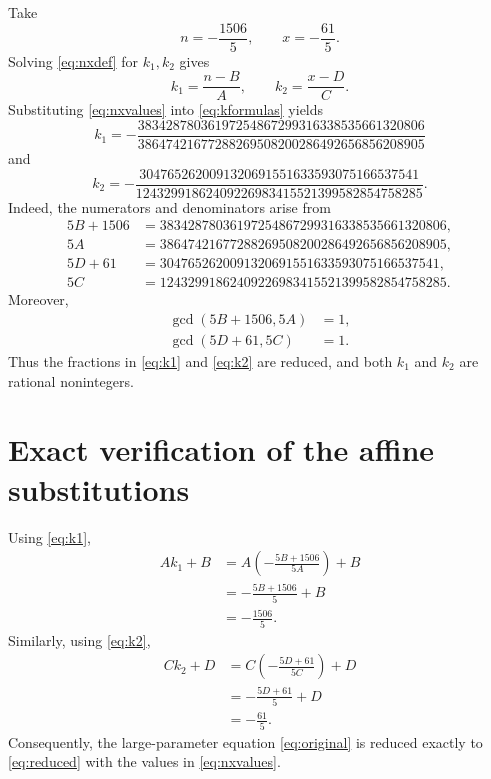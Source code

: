 \documentclass[11pt]{article}
\begin{document}
Take
\begin{equation}\label{eq:nxvalues}
 n=-\frac{1506}{5},\qquad x=-\frac{61}{5}.
\end{equation}
Solving \eqref{eq:nxdef} for \(k_1,k_2\) gives
\begin{equation}\label{eq:kformulas}
 k_1=\frac{n-B}{A},\qquad k_2=\frac{x-D}{C}.
\end{equation}
Substituting \eqref{eq:nxvalues} into \eqref{eq:kformulas} yields
\begin{equation}\label{eq:k1}
\boxed{
 k_1=-\frac{
 38342878036197254867299316338535661320806
 }{
 38647421677288269508200286492656856208905
 }}
\end{equation}
and
\begin{equation}\label{eq:k2}
\boxed{
 k_2=-\frac{
 3047652620091320691551633593075166537541
 }{
 12432991862409226983415521399582854758285
 }}.
\end{equation}
Indeed, the numerators and denominators arise from
\begin{align*}
5B+1506
 &=38342878036197254867299316338535661320806,\\
5A
 &=38647421677288269508200286492656856208905,\\
5D+61
 &=3047652620091320691551633593075166537541,\\
5C
 &=12432991862409226983415521399582854758285.
\end{align*}
Moreover,
\begin{align*}
\gcd(5B+1506,5A)&=1,\\
\gcd(5D+61,5C)&=1.
\end{align*}
Thus the fractions in \eqref{eq:k1} and \eqref{eq:k2} are reduced, and both
\(k_1\) and \(k_2\) are rational nonintegers.

\section{Exact verification of the affine substitutions}

Using \eqref{eq:k1},
\begin{align*}
Ak_1+B
&=A\left(-\frac{5B+1506}{5A}\right)+B\\
&=-\frac{5B+1506}{5}+B\\
&=-\frac{1506}{5}.
\end{align*}
Similarly, using \eqref{eq:k2},
\begin{align*}
Ck_2+D
&=C\left(-\frac{5D+61}{5C}\right)+D\\
&=-\frac{5D+61}{5}+D\\
&=-\frac{61}{5}.
\end{align*}
Consequently, the large-parameter equation \eqref{eq:original} is reduced
exactly to \eqref{eq:reduced} with the values in \eqref{eq:nxvalues}.
\end{document}
